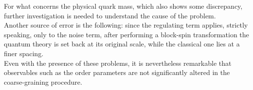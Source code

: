 For what concerns the physical quark mass, which also shows some discrepancy, further investigation is needed to understand the cause of the problem. \\
Another source of error is the following: since the regulating term applies, strictly speaking, only to the noise term, after performing a block-spin transformation the quantum theory is set back at its original scale, while the classical one lies at a finer spacing. \\
Even with the presence of these problems, it is nevertheless remarkable that observables such as the order parameters are not significantly altered in the coarse-graining procedure.